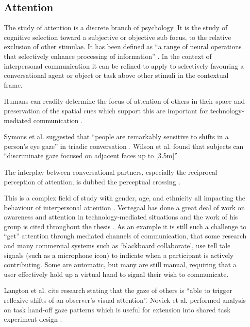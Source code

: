 \subsection{Attention}
The study of attention is a discrete branch of psychology. It is the study of cognitive selection toward a subjective or objective sub focus, to the relative exclusion of other stimulae. It has been defined as ``a range of neural operations that selectively enhance processing of information'' \cite{carlston2013oxford}. In the context of interpersonal communication it can be refined to apply to selectively favouring a conversational agent or object or task above other stimuli in the contextual frame.\par
Humans can readily determine the focus of attention of others in their space \cite{Stiefelhagen2001} and preservation of the spatial cues which support this are important for technology-mediated communication \cite{Sellen1992} \cite{Stiefelhagen2002}.\par
Symons et al. suggested that ``people are remarkably sensitive to shifts in a person's eye gaze'' in triadic conversation \cite{Symons2004}. Wilson et al. found that subjects can ``discriminate gaze focused on adjacent faces up to [3.5m]'' \cite{Wilson2000}\par
The interplay between conversational partners, especially the reciprocal perception of attention, is dubbed the perceptual crossing \cite{Deckers2013, Gibson1963}.\par
This is a complex field of study with gender, age, and ethnicity all impacting the behaviour of interpersonal attention \cite{Bente1998, Slessor2008, Argyle, Hofmann20061683, Pan2008a}.
Vertegaal has done a great deal of work on awareness and attention in technology-mediated situations and the work of his group is cited throughout the thesis \cite{Vertegaal1997}. As an example it is still such a challenge to ``get'' attention through mediated channels of communication, that some research \cite{Fels2000, Sellen1992} and many commercial systems such as `blackboard collaborate', use tell tale signals (such as a microphone icon) to indicate when a participant is actively contributing. Some are automatic, but many are still manual, requiring that a user effectively hold up a virtual hand to signal their wish to communicate.\par
Langton et al. cite research stating that the gaze of others is ``able to trigger reflexive shifts of an observer's visual attention''. Novick et al. performed analysis on task hand-off gaze patterns which is useful for extension into shared task experiment design \cite{Novick1996}.\par
